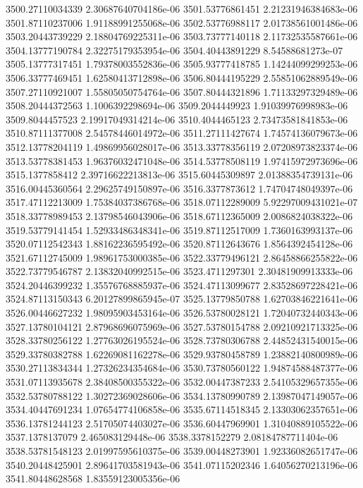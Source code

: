 {3500.27110034339 2.30687640704186e-06
3501.53776861451 2.21231946384683e-06
3501.87110237006 1.91188991255068e-06
3502.53776988117 2.01738561001486e-06
3503.20443739229 2.18804769225311e-06
3503.73777140118 2.11732535587661e-06
3504.13777190784 2.32275179353954e-06
3504.40443891229 8.54588681273e-07
3505.13777317451 1.79378003552836e-06
3505.93777418785 1.14244099299253e-06
3506.33777469451 1.62580413712898e-06
3506.80444195229 2.55851062889549e-06
3507.27110921007 1.55805050754764e-06
3507.80444321896 1.71133297329489e-06
3508.20444372563 1.1006392298694e-06
3509.2044449923 1.91039976998983e-06
3509.8044457523 2.19917049314214e-06
3510.4044465123 2.73473581841853e-06
3510.87111377008 2.54578446014972e-06
3511.27111427674 1.74574136079673e-06
3512.13778204119 1.49869956028017e-06
3513.33778356119 2.07208973823374e-06
3513.53778381453 1.96376032471048e-06
3514.53778508119 1.97415972973696e-06
3515.1377858412 2.39716622213813e-06
3515.60445309897 2.01388354739131e-06
3516.00445360564 2.29625749150897e-06
3516.3377873612 1.74704748049397e-06
3517.47112213009 1.75384037386768e-06
3518.07112289009 5.92297009431021e-07
3518.33778989453 2.13798546043906e-06
3518.67112365009 2.0086824038322e-06
3519.53779141454 1.52933486348341e-06
3519.87112517009 1.7360163993137e-06
3520.07112542343 1.88162236595492e-06
3520.87112643676 1.8564392454128e-06
3521.67112745009 1.98961753000385e-06
3522.33779496121 2.86458866255822e-06
3522.73779546787 2.13832040992515e-06
3523.4711297301 2.30481909913333e-06
3524.20446399232 1.35576768885937e-06
3524.47113099677 2.83528697228421e-06
3524.87113150343 6.20127899865945e-07
3525.13779850788 1.62703846221641e-06
3526.00446627232 1.98095903453164e-06
3526.53780028121 1.72040732440343e-06
3527.13780104121 2.87968696075969e-06
3527.53780154788 2.09210921713325e-06
3528.33780256122 1.27763026195524e-06
3528.73780306788 2.44852431540015e-06
3529.33780382788 1.62269081162278e-06
3529.93780458789 1.23882140800989e-06
3530.27113834344 1.27326234354684e-06
3530.73780560122 1.94874588487377e-06
3531.07113935678 2.38408500355322e-06
3532.00447387233 2.54105329657355e-06
3532.53780788122 1.30272369028606e-06
3534.13780990789 2.13987047149057e-06
3534.40447691234 1.07654774106858e-06
3535.67114518345 2.13303062357651e-06
3536.13781244123 2.51705074403027e-06
3536.60447969901 1.31040889105522e-06
3537.1378137079 2.465083129448e-06
3538.3378152279 2.08184787711404e-06
3538.53781548123 2.01997595610375e-06
3539.00448273901 1.92336082651747e-06
3540.20448425901 2.89641703581943e-06
3541.07115202346 1.64056270213196e-06
3541.80448628568 1.83559123005356e-06
}
